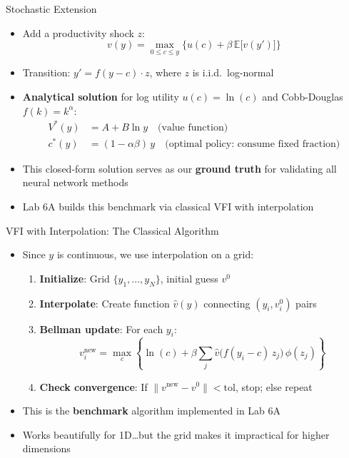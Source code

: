 \documentclass[10pt,english,aspectratio=169]{beamer}
\begin{document}
\begin{frame}{Stochastic Extension}
\begin{itemize}
  \item Add a productivity shock $z$:
    \[
      v(y) = \max_{0 \leq c \leq y} \Big\{ u(c) + \beta\, \mathbb{E}\big[v(y')\big] \Big\}
    \]
  \item Transition: $y' = f(y - c)\cdot z$, where $z$ is i.i.d.\ log-normal
  \medskip
  \item \textbf{Analytical solution} for log utility $u(c) = \ln(c)$ and Cobb-Douglas $f(k) = k^\alpha$:
    \begin{align*}
      V^*(y) &= A + B \ln y \quad \text{(value function)} \\
      c^*(y) &= (1 - \alpha\beta)\, y \quad \text{(optimal policy: consume fixed fraction)}
    \end{align*}
  \medskip
  \item This closed-form solution serves as our \textbf{ground truth} for validating all neural network methods
  \item Lab 6A builds this benchmark via classical VFI with interpolation
\end{itemize}
\end{frame}

\begin{frame}{VFI with Interpolation: The Classical Algorithm}
\begin{itemize}
  \item Since $y$ is continuous, we use interpolation on a grid:
  \medskip
  \begin{enumerate}
    \item \textbf{Initialize}: Grid $\{y_1, \ldots, y_N\}$, initial guess $v^0$
    \item \textbf{Interpolate}: Create function $\hat{v}(y)$ connecting $(y_i, v^0_i)$ pairs
    \item \textbf{Bellman update}: For each $y_i$:
      \[
        v^{\text{new}}_i = \max_c \left\{\ln(c) + \beta \sum_j \hat{v}\big(f(y_i - c)\, z_j\big)\, \phi(z_j)\right\}
      \]
    \item \textbf{Check convergence}: If $\|v^{\text{new}} - v^0\| < \text{tol}$, stop; else repeat
  \end{enumerate}
  \medskip
  \item This is the \textbf{benchmark} algorithm implemented in Lab 6A
  \item Works beautifully for 1D\ldots but the grid makes it impractical for higher dimensions
\end{itemize}
\end{frame}
\end{document}
